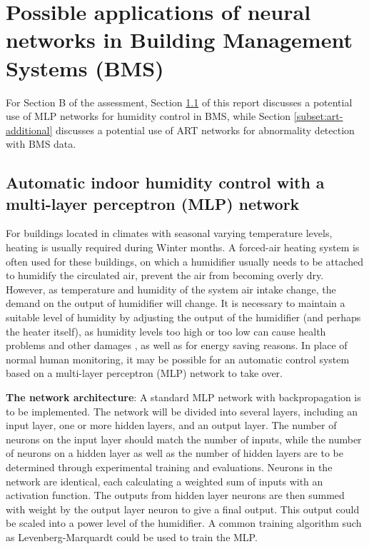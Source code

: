 \documentclass[10pt, oneside]{article}
\begin{document}
\section{Possible applications of neural networks in Building Management Systems (BMS)}

For Section B of the assessment, Section \ref{subset:mlp-additional} of this report discusses a potential use of MLP networks for humidity control in BMS, while Section \ref{subset:art-additional} discusses a potential use of ART networks for abnormality detection with BMS data.

\subsection{Automatic indoor humidity control with a multi-layer perceptron (MLP) network} \label{subset:mlp-additional}

For buildings located in climates with seasonal varying temperature levels, heating is usually required during Winter months. A forced-air heating system is often used for these buildings, on which a humidifier \cite{swimmer1970forced} usually needs to be attached to humidify the circulated air, prevent the air from becoming overly dry. However, as temperature and humidity of the system air intake change, the demand on the output of humidifier will change. It is necessary to maintain a suitable level of humidity by adjusting the output of the humidifier (and perhaps the heater itself), as humidity levels too high or too low can cause health problems and other damages \cite{humidity-factors}, as well as for energy saving reasons. In place of normal human monitoring, it may be possible for an automatic control system based on a multi-layer perceptron (MLP) network to take over.

\textbf{The network architecture}: A standard MLP network with backpropagation is to be implemented. The network will be divided into several layers, including an input layer, one or more hidden layers, and an output layer. The number of neurons on the input layer should match the number of inputs, while the number of neurons on a hidden layer as well as the number of hidden layers are to be determined through experimental training and evaluations. Neurons in the network are identical, each calculating a weighted sum of inputs with an activation function. The outputs from hidden layer neurons are then summed with weight by the output layer neuron to give a final output. \cite[p. 2]{rbf-lecture} This output could be scaled into a power level of the humidifier. A common training algorithm such as Levenberg-Marquardt could be used to train the MLP.
\end{document}
